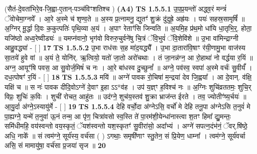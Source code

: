 \documentclass[17pt]{extarticle}
\begin{document}
                  \newline
                      (सैतं-दे॒वता॑भिरे॒व-जि॒ह्वा-ए॒तान्-पञ्च॑विꣳशतिश्च )  \textbf{(A4)} \newline \newline
                                        \textbf{ TS 1.5.5.1} \newline
                  उ॒प॒प्र॒यन्तो॑ अद्ध्व॒रं मन्त्रं॑ ॅवोचेमा॒ग्नये᳚ । आ॒रे अ॒स्मे च॑ शृण्व॒ते ॥ अ॒स्य प्र॒त्नामनु॒ द्युतꣳ॑ शु॒क्रं दु॑दुह्रे॒ अह्र॑यः । पयः॑ सहस्र॒सामृषिं᳚ ॥ अ॒ग्निर् मू॒र्द्धा दि॒वः क॒कुत्पतिः॑ पृथि॒व्या अ॒यं । अ॒पाꣳ रेताꣳ॑सि जिन्वति ॥ अ॒यमि॒ह प्र॑थ॒मो धा॑यि धा॒तृभि॒र्॒. होता॒ यजि॑ष्ठो अध्व॒रेष्वीड्यः॑ ॥ यमप्न॑वानो॒ भृग॑वो विरुरु॒चुर्वने॑षु चि॒त्रं ॅवि॒भुवं॑ ॅवि॒शेवि॑शे ॥ उ॒भा वा॑मिन्द्राग्नी आहु॒वद्ध्या॑ - [ ] \textbf{  17} \newline
                  \newline
                                \textbf{ TS 1.5.5.2} \newline
                  उ॒भा राध॑सः स॒ह मा॑द॒यद्ध्यै᳚ । उ॒भा दा॒तारा॑वि॒षाꣳ र॑यी॒णामु॒भा वाज॑स्य सा॒तये॑ हुवे वां ॥ अ॒यं ते॒ योनि॑र्. ऋ॒त्वियो॒ यतो॑ जा॒तो अरो॑चथाः । तं जा॒नन्न॑ग्न॒ आ रो॒हाथा॑ नो वर्द्धया र॒यिं ॥ अग्न॒ आयूꣳ॑षि पवस॒ आ सु॒वोर्ज॒मिषं॑ च नः । आ॒रे बा॑धस्व दु॒च्छुनां᳚ ॥ अग्ने॒ पव॑स्व॒ स्वपा॑ अ॒स्मे वर्चः॑ सु॒वीर्यं᳚ । दध॒त्पोषꣳ॑ र॒यिं - [ ] \textbf{  18} \newline
                  \newline
                                \textbf{ TS 1.5.5.3} \newline
                  मयि॑ ॥ अग्ने॑ पावक रो॒चिषा॑ म॒न्द्रया॑ देव जि॒ह्वया᳚ । आ दे॒वान्. व॑क्षि॒ यक्षि॑ च ॥ स नः॑ पावक दीदि॒वोऽग्ने॑ दे॒वाꣳ इ॒हा ऽऽ*व॑ह । उप॑ य॒ज्ञ्ꣳ ह॒विश्च॑ नः ॥ अ॒ग्निः शुचि॑व्रततमः॒ शुचि॒र् विप्रः॒ शुचिः॑ क॒विः । शुची॑ रोचत॒ आहु॑तः ॥ उद॑ग्ने॒ शुच॑य॒स्तव॑ शु॒क्रा भ्राज॑न्त ईरते । तव॒ ज्योतीꣳ॑ष्य॒र्चयः॑ ॥ आ॒यु॒र्दा अ॑ग्ने॒ऽस्यायु॑र्मे - [ ] \textbf{  19} \newline
                  \newline
                                \textbf{ TS 1.5.5.4} \newline
                  देहि वर्चो॒दा अ॑ग्नेऽसि॒ वर्चो॑ मे देहि तनू॒पा अ॑ग्नेऽसि त॒नुवं॑ मे पा॒ह्यग्ने॒ यन्मे॑ त॒नुवा॑ ऊ॒नं तन्म॒ आ पृ॑ण॒ चित्रा॑वसो स्व॒स्ति ते॑ पा॒रम॑शी॒येन्धा॑नास्त्वा श॒तꣳ हिमा᳚ द्यु॒मन्तः॒ समि॑धीमहि॒ वय॑स्वन्तो वय॒स्कृतं॒ ॅयश॑स्वन्तो यश॒स्कृतꣳ॑ सु॒वीरा॑सो॒ अदा᳚भ्यं । अग्ने॑ सपत्न॒दंभ॑नं॒ ॅवर्.षि॑ष्ठे॒ अधि॒ नाके᳚ ॥ सं त्वम॑ग्ने॒ सूर्य॑स्य॒ वर्च॑सा ( ) ऽगथाः॒ समृषी॑णाꣳ स्तु॒तेन॒ सं प्रि॒येण॒ धाम्ना᳚ । त्वम॑ग्ने॒ सूर्य॑वर्चा असि॒ सं मामायु॑षा॒ वर्च॑सा प्र॒जया॑ सृज ॥ \textbf{  20} \newline
\end{document}
